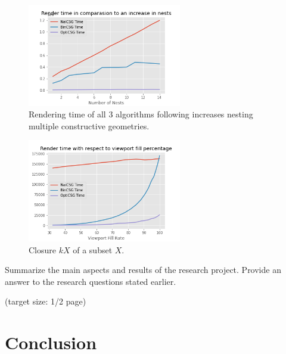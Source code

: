 \documentclass[a4paper,11pt,oneside]{article}
\begin{document}
\begin{figure}[H]
	\begin{center}
		\includegraphics[width=0.6\textwidth]{section5/nest-performance.png}
	\end{center}
	\caption{Rendering time of all 3 algorithms following increases nesting multiple constructive geometries.}
	\label{sec5.1:comparative-csg-operations}
\end{figure}
\begin{figure}[H]
	\begin{center}
		\includegraphics[width=0.6\textwidth]{section5/viewport-performance.png}
	\end{center}
	\caption{Closure $kX$ of a subset $X$.}
	\label{sec5.1:closure}
\end{figure}


Summarize the main aspects and results of the research
project. Provide an answer to the research questions stated earlier.

(target size: 1/2 page)

\section{Conclusion}

\newpage
%
%
\printbibliography
\end{document}
